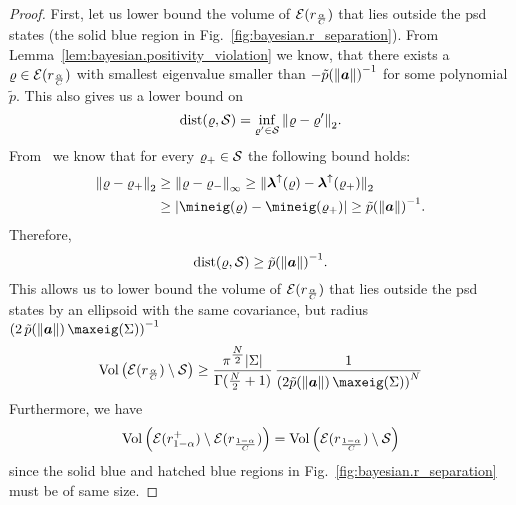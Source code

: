 \begin{proof}
  First, let us lower bound the volume of $\mathcal{E}(r_\frac{\alpha}{C})$ that lies outside the psd states (the solid blue region in Fig.~\ref{fig:bayesian.r_separation}).
  From Lemma~\ref{lem:bayesian.positivity_violation} we know, that there exists a $\varrho\in \mathcal{E}(r_\frac{\alpha}{C})$ with smallest eigenvalue smaller than $- \tilde p{({\Vert{\boldsymbol{a}}\Vert})}^{-1}$ for some polynomial $\tilde p$.
  This also gives us a lower bound on
  \begin{equation}
    \mathrm{dist}(\varrho,\mathcal{S}) = \inf_{\varrho' \in \mathcal{S}} {\Vert\varrho - \varrho'\Vert}_2.
  \end{equation}
  From~\cite[Theorem~III.2.8]{Bhatia_1997_Matrix} we know that for every $\varrho_+ \in \mathcal{S}$ the following bound holds:
  \begin{equation}
    \begin{split}
      \norm{\varrho - \varrho_+}_2
      &\ge \norm{\varrho - \varrho_-}_\infty
      \ge \norm{\vec\lambda^\uparrow(\varrho) - \vec\lambda^\uparrow(\varrho_+)}_2 \\
      &\ge \abs{\mineig(\varrho) - \mineig(\varrho_+)}
      \ge \tilde p{(\norm{\vec a})}^{-1}.
    \end{split}
  \end{equation}
  Therefore,
  \begin{equation}
    \label{eq:bayesian.r_separation.dist}
    \mathrm{dist}(\varrho,\mathcal{S}) \ge \tilde p{({\Vert{\boldsymbol{a}}\Vert})}^{-1}.
  \end{equation}
  This allows us to lower bound the volume of $\mathcal{E}(r_\frac{\alpha}{C})$ that lies outside the psd states by an ellipsoid with the same covariance, but radius ${(2\, \tilde p(\norm{\vec a}) \, \maxeig(\Sigma))}^{-1}$
  \begin{align}
    \label{eq:bayesian.r_separation.volume}
    \mathrm{Vol}\left( \Eps(r_\frac{\alpha}{C}) \setminus \States \right)
    &\ge \frac{\pi^{\Nhalf} \abs{\Sigma}}{\Gamma(\Nhalf + 1)} \, \frac{1}{{\left( 2 \tilde p(\norm{\vec a}) \, \maxeig(\Sigma) \right)}^{N}} \\
  \end{align}
  Furthermore, we have
  \begin{equation}
    \label{eq:bayesian.r_separation.volume2}
    \mathrm{Vol}\left(\mathcal{E}(r^+_{1-\alpha}) \setminus \mathcal{E}(r_\frac{1-\alpha}{C}) \right)
    = \mathrm{Vol}\left( \mathcal{E}(r_\frac{1-\alpha}{C}) \setminus \mathcal{S} \right)
  \end{equation}
  since the solid blue and hatched blue regions in Fig.~\ref{fig:bayesian.r_separation} must be of same size.


\end{proof}

